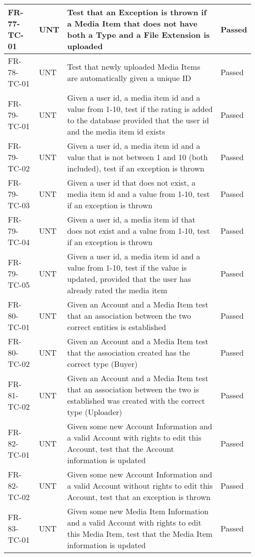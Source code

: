 \documentclass[../report.tex]{subfiles}
\begin{document}
\begin{longtable}{|L{2.1cm}|L{0.8cm}|L{9cm}|L{1.2cm}|}
FR-77-TC-01&UNT&Test that an Exception is thrown if a Media Item that does not have both a Type and a File Extension is uploaded&Passed  \\ \hline
FR-78-TC-01&UNT&Test that newly uploaded Media Items are automatically given a unique ID&Passed  \\ \hline
FR-79-TC-01&UNT&Given a user id, a media item id and a value from 1-10, test if the rating is added to the database provided that the user id and the media item id exists&Passed  \\ \hline
FR-79-TC-02&UNT&Given a user id, a media item id and a value that is not between 1 and 10 (both included), test if an exception is thrown&Passed  \\ \hline
FR-79-TC-03&UNT&Given a user id that does not exist, a media item id and a value from 1-10, test if an exception is thrown&Passed  \\ \hline
FR-79-TC-04&UNT&Given a user id, a media item id that does not exist and a value from 1-10, test if an exception is thrown&Passed  \\ \hline
FR-79-TC-05&UNT&Given a user id, a media item id and a value from 1-10, test if the value is updated, provided that the user has already rated the media item&Passed  \\ \hline
FR-80-TC-01&UNT&Given an Account and a Media Item test that an association between the two correct entities is established &Passed  \\ \hline
FR-80-TC-02&UNT&Given an Account and a Media Item test that the association created has the correct type (Buyer)&Passed  \\ \hline
FR-81-TC-02&UNT&Given an Account and a Media Item test that an association between the two is established was created with the correct type (Uploader)&Passed  \\ \hline
FR-82-TC-01&UNT&Given some new Account Information and a valid Account with rights to edit this Account, test that the Account information is updated&Passed  \\ \hline
FR-82-TC-02&UNT&Given some new Account Information and a valid Account without rights to edit this Account, test that an exception is thrown&Passed  \\ \hline
FR-83-TC-01&UNT&Given some new Media Item Information and a valid Account with rights to edit this Media Item, test that the Media Item information is updated&Passed  \\ \hline

\end{longtable}
\end{document}
